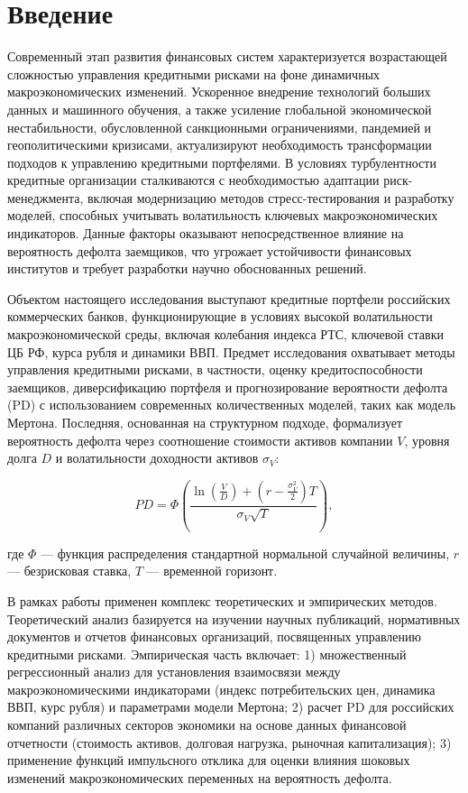 \documentclass[]{article}
\begin{document}
	
	
	
	\newpage
	\tableofcontents
	
	\newpage
	\section{Введение}
		
	
	Современный этап развития финансовых систем характеризуется возрастающей сложностью управления кредитными рисками на фоне динамичных макроэкономических изменений. Ускоренное внедрение технологий больших данных и машинного обучения, а также усиление глобальной экономической нестабильности, обусловленной санкционными ограничениями, пандемией и геополитическими кризисами, актуализируют необходимость трансформации подходов к управлению кредитными портфелями. В условиях турбулентности кредитные организации сталкиваются с необходимостью адаптации риск-менеджмента, включая модернизацию методов стресс-тестирования и разработку моделей, способных учитывать волатильность ключевых макроэкономических индикаторов. Данные факторы оказывают непосредственное влияние на вероятность дефолта заемщиков, что угрожает устойчивости финансовых институтов и требует разработки научно обоснованных решений.  
	
	Объектом настоящего исследования выступают кредитные портфели российских коммерческих банков, функционирующие в условиях высокой волатильности макроэкономической среды, включая колебания индекса РТС, ключевой ставки ЦБ РФ, курса рубля и динамики ВВП. Предмет исследования охватывает методы управления кредитными рисками, в частности, оценку кредитоспособности заемщиков, диверсификацию портфеля и прогнозирование вероятности дефолта (PD) с использованием современных количественных моделей, таких как модель Мертона. Последняя, основанная на структурном подходе, формализует вероятность дефолта через соотношение стоимости активов компании \( V \), уровня долга \( D \) и волатильности доходности активов \( \sigma_V \):  
	
	\[
	PD = \Phi\left( \frac{\ln\left(\frac{V}{D}\right) + \left(r - \frac{\sigma_V^2}{2}\right)T}{\sigma_V \sqrt{T}} \right),
	\]  
	
	где \( \Phi \) — функция распределения стандартной нормальной случайной величины, \( r \) — безрисковая ставка, \( T \) — временной горизонт.  
	
	В рамках работы применен комплекс теоретических и эмпирических методов. Теоретический анализ базируется на изучении научных публикаций, нормативных документов и отчетов финансовых организаций, посвященных управлению кредитными рисками. Эмпирическая часть включает:  
	1) множественный регрессионный анализ для установления взаимосвязи между макроэкономическими индикаторами (индекс потребительских цен, динамика ВВП, курс рубля) и параметрами модели Мертона;  
	2) расчет PD для российских компаний различных секторов экономики на основе данных финансовой отчетности (стоимость активов, долговая нагрузка, рыночная капитализация);  
	3) применение функций импульсного отклика для оценки влияния шоковых изменений макроэкономических переменных на вероятность дефолта.  
	
\end{document}
